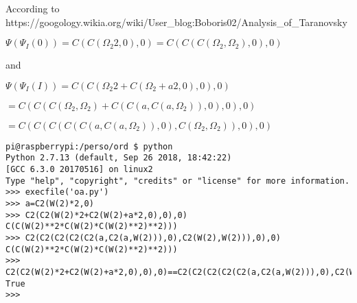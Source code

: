 \documentclass[10pt]{article}
\begin{document}
According to https://googology.wikia.org/wiki/User\_blog:Boboris02/Analysis\_of\_Taranovsky%

$\Psi(\Psi_I(0)) = C(C(\Omega_2 2,0),0) = C(C(C(\Omega_2,\Omega_2),0),0)$

and

$ \Psi(\Psi_I(I)) = C(C(\Omega_2 2+C(\Omega_2+a 2,0),0),0) $

$  = C(C(C(\Omega_2,\Omega_2)+C(C(a,C(a,\Omega_2)),0),0),0) $
 
$  = C(C(C(C(C(a,C(a,\Omega_2)),0),C(\Omega_2,\Omega_2)),0),0) $

\begin{verbatim}
pi@raspberrypi:/perso/ord $ python
Python 2.7.13 (default, Sep 26 2018, 18:42:22)
[GCC 6.3.0 20170516] on linux2
Type "help", "copyright", "credits" or "license" for more information.
>>> execfile('oa.py')
>>> a=C2(W(2)*2,0)
>>> C2(C2(W(2)*2+C2(W(2)+a*2,0),0),0)
C(C(W(2)**2*C(W(2)*C(W(2)**2)**2)))
>>> C2(C2(C2(C2(C2(a,C2(a,W(2))),0),C2(W(2),W(2))),0),0)
C(C(W(2)**2*C(W(2)*C(W(2)**2)**2)))
>>> C2(C2(W(2)*2+C2(W(2)+a*2,0),0),0)==C2(C2(C2(C2(C2(a,C2(a,W(2))),0),C2(W(2),W(2))),0),0)
True
>>>
\end{verbatim}
\end{document}
